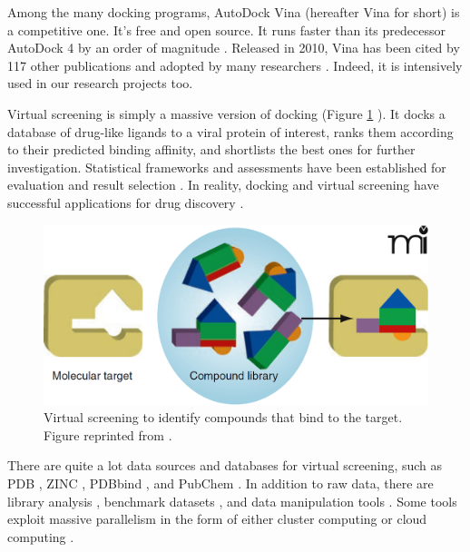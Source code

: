 Among the many docking programs, AutoDock Vina \citep{595} (hereafter Vina for short) is a competitive one. It's free and open source. It runs faster than its predecessor AutoDock 4 \citep{596} by an order of magnitude \citep{556}. Released in 2010, Vina has been cited by 117 other publications and adopted by many researchers \citep{609}. Indeed, it is intensively used in our research projects too.

Virtual screening is simply a massive version of docking (Figure \ref{Background:VirtualScreening} \citep{470}). It docks a database of drug-like ligands to a viral protein of interest, ranks them according to their predicted binding affinity, and shortlists the best ones for further investigation. Statistical frameworks and assessments have been established for evaluation and result selection \citep{489,491,769,583,582}. In reality, docking and virtual screening have successful applications for drug discovery \citep{495,498,751,503,752,757,506,738,761,763,766,736}.

\begin{figure}
\centering
\includegraphics[width=\textwidth]{Background/VirtualScreening.png}
\caption{Virtual screening to identify compounds that bind to the target. Figure reprinted from \citep{470}.}
\label{Background:VirtualScreening}
\end{figure}

There are quite a lot data sources and databases for virtual screening, such as PDB \citep{540,537}, ZINC \citep{532,1178}, PDBbind \citep{529,530}, and PubChem \citep{526}. In addition to raw data, there are library analysis \citep{521}, benchmark datasets \citep{534,533,535,536}, and data manipulation tools \citep{542}. Some tools exploit massive parallelism in the form of either cluster computing or cloud computing \citep{557,773,560,782}.


